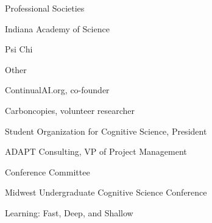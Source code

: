 
\begin{cventries}

  \cventry
    {Professional Societies} %
    {} %
    {} %
    {} %
    {
      \begin{cvitems} %
        \item {Indiana Academy of Science}
	\item{Psi Chi}
      \end{cvitems}
    }

  \cventry
    {Other} %
    {} %
    {} %
    {} %
    {
      \begin{cvitems} %
        \item {ContinualAI.org, co-founder}
	\item {Carboncopies, volunteer researcher}
	\item {Student Organization for Cognitive Science, President}
	\item {ADAPT Consulting, VP of Project Management}
      \end{cvitems}
    }

 \cventry
    {Conference Committee} %
    {} %
    {} %
    {} %
    {
      \begin{cvitems} %
        \item {Midwest Undergraduate Cognitive Science Conference}
	\item{Learning: Fast, Deep, and Shallow}
      \end{cvitems}
    }
\end{cventries}
